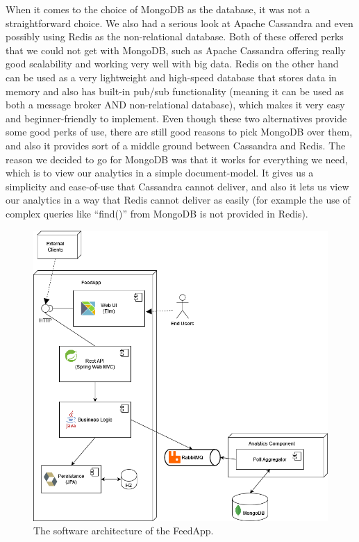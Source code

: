 When it comes to the choice of MongoDB as the database, it was not a straightforward choice. We also had a serious look at Apache Cassandra and even possibly using Redis as the non-relational database. Both of these offered perks that we could not get with MongoDB, such as Apache Cassandra offering really good scalability and working very well with big data. Redis on the other hand can be used as a very lightweight and high-speed database that stores data in memory and also has built-in pub/sub functionality (meaning it can be used as both a message broker AND non-relational database), which makes it very easy and beginner-friendly to implement. Even though these two alternatives provide some good perks of use, there are still good reasons to pick MongoDB over them, and also it provides sort of a middle ground between Cassandra and Redis. The reason we decided to go for MongoDB was that it works for everything we need, which is to view our analytics in a simple document-model. It gives us a simplicity and ease-of-use that Cassandra cannot deliver, and also it lets us view our analytics in a way that Redis cannot deliver as easily (for example the use of complex queries like “find()” from MongoDB is not provided in Redis).

\begin{figure}[H]
	\centering
	\includegraphics[scale=0.5]{figs/DAT250architecture.png}
	\caption{The software architecture of the FeedApp.}
	\label{fig:DAT250architecture}
\end{figure}
